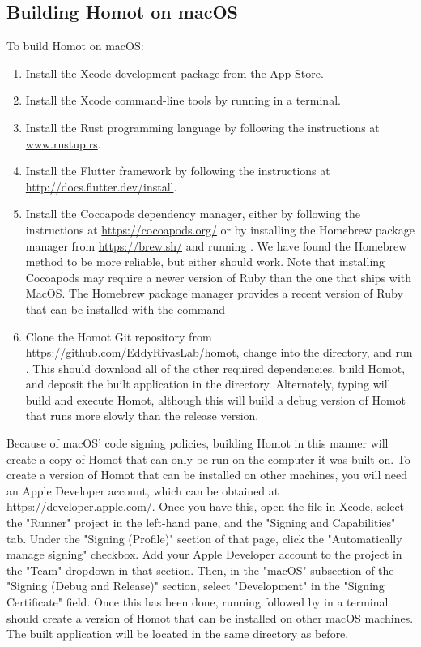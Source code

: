 \documentclass[notoc,justified,openany]{tufte-book}    %
\newcommand{\homot }{{Homot}\xspace}  %
\newcommand{\macos}{{macOS}\xspace}
\begin{document}
\subsection{Building \homot on \macos}
To build \homot on \macos:
\begin{enumerate}
  \item{Install the Xcode development package from the App Store.}
  \item{Install the Xcode command-line tools by running  in a terminal.}
  \item{Install the Rust programming language by following the instructions at \url{www.rustup.rs}.}
  \item{Install the Flutter framework by following the instructions at \url{http://docs.flutter.dev/install}.}
  \item{Install the Cocoapods dependency manager, either by following the instructions at \url{https://cocoapods.org/} or by installing the Homebrew package manager from \url{https://brew.sh/} and running .  We have found the Homebrew method to be more reliable, but either should work. Note that installing Cocoapods may require a newer version of Ruby than the one that ships with MacOS.  The Homebrew package manager provides a recent version of Ruby that can be installed with the command }
  \item{Clone the \homot Git repository from \url{https://github.com/EddyRivasLab/homot}, change into the  directory, and run .  This should download all of the other required dependencies, build \homot, and deposit the built application in the  directory.  Alternately, typing  will build and execute \homot, although this will build a debug version of \homot that runs more slowly than the release version.}
\end{enumerate}

Because of \macos' code signing policies, building \homot in this manner will create a copy of \homot that can only be run on the computer it was built on.  To create a version of \homot that can be installed on other machines, you will need an Apple Developer account, which can be obtained at \url{https://developer.apple.com/}. Once you have this, open the file  in Xcode, select the "Runner" project in the left-hand pane, and the "Signing and Capabilities" tab.  Under the "Signing (Profile)" section of that page, click the "Automatically manage signing" checkbox. Add your Apple Developer account to the project in the "Team" dropdown in that section.  Then, in the "\macos" subsection of the "Signing (Debug and Release)" section, select "Development" in the "Signing Certificate" field. Once this has been done, running  followed by  in a terminal should create a version of \homot that can be installed on other \macos machines.  The built application will be located in the same directory as before.   
\end{document}
